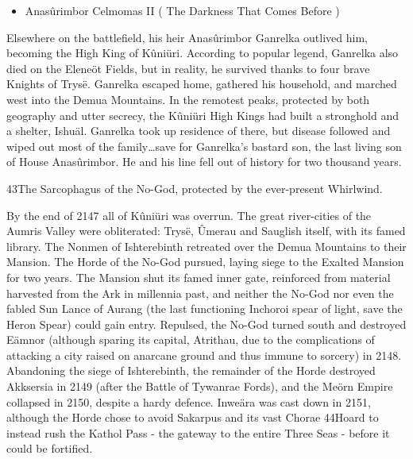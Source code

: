 \documentclass[]{book}
\providecommand{\tightlist}{%
  \setlength{\itemsep}{0pt}\setlength{\parskip}{0pt}}
\begin{document}
\begin{itemize}
\tightlist
\item
  Anasûrimbor Celmomas II ( The Darkness That Comes Before )
\end{itemize}

Elsewhere on the battlefield, his heir Anasûrimbor Ganrelka outlived him, becoming
the High King of Kûniüri. According to popular legend, Ganrelka also died on the
Eleneöt Fields, but in reality, he survived thanks to four brave Knights of Trysë.
Ganrelka escaped home, gathered his household, and marched west into the Demua
Mountains. In the remotest peaks, protected by both geography and utter secrecy, the
Kûniüri High Kings had built a stronghold and a shelter, Ishuäl. Ganrelka took up
residence of there, but disease followed and wiped out most of the family\ldots{}save for
Ganrelka's bastard son, the last living son of House Anasûrimbor. He and his line fell
out of history for two thousand years.

43The Sarcophagus of the No-God, protected by the ever-present Whirlwind.

By the end of 2147 all of Kûniüri was overrun. The great river-cities of the Aumris
Valley were obliterated: Trysë, Ûmerau and Sauglish itself, with its famed library. The
Nonmen of Ishterebinth retreated over the Demua Mountains to their Mansion. The
Horde of the No-God pursued, laying siege to the Exalted Mansion for two years. The
Mansion shut its famed inner gate, reinforced from material harvested from the Ark in
millennia past, and neither the No-God nor even the fabled Sun Lance of Aurang (the
last functioning Inchoroi spear of light, save the Heron Spear) could gain entry.
Repulsed, the No-God turned south and destroyed Eämnor (although sparing its
capital, Atrithau, due to the complications of attacking a city raised on anarcane
ground and thus immune to sorcery) in 2148. Abandoning the siege of Ishterebinth,
the remainder of the Horde destroyed Akksersia in 2149 (after the Battle of Tywanrae
Fords), and the Meörn Empire collapsed in 2150, despite a hardy defence. Inweära was
cast down in 2151, although the Horde chose to avoid Sakarpus and its vast Chorae
44Hoard to instead rush the Kathol Pass - the gateway to the entire Three Seas - before it
could be fortified.
\end{document}
